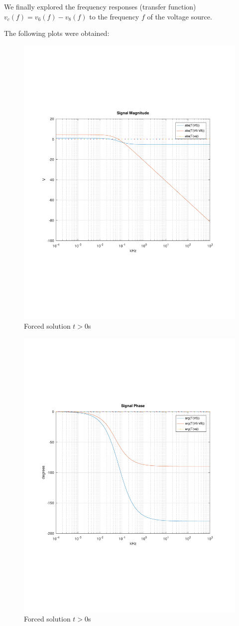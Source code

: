 We finally explored the frequency responses (transfer function) $v_c(f)= v_6(f)-v_8(f)$ to the frequency $f$ of the voltage source. 

The following plots were obtained:

\begin{figure}[h!] \centering
\includegraphics[width=0.6\linewidth]{../mat/TransAbs.pdf}
\caption{Forced solution $t > 0$s}
\label{fig:TForcedP}
\end{figure}

\begin{figure}[h!] \centering
\includegraphics[width=0.6\linewidth]{../mat/TransPha.pdf}
\caption{Forced solution $t > 0$s}
\label{fig:TForcedP}
\end{figure}

\newpage

